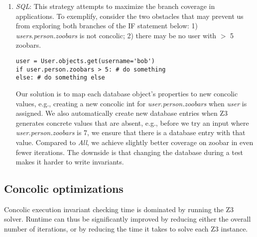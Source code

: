 \documentclass{article}
\begin{document}
\begin{enumerate}
\item \textit{SQL}:
  This strategy attempts to maximize the branch coverage in applications. To
  exemplify, consider the two obstacles that may prevent us from exploring both
  branches of the IF statement below:
  1) \textit{users.person.zoobars} is not
  concolic; 2) there may be no user with $>$ 5 zoobars.
  \begin{verbatim}user = User.objects.get(username='bob')
if user.person.zoobars > 5: # do something
else: # do something else\end{verbatim}
  Our solution is to map each database object's properties to new concolic
  values, e.g., creating a new concolic int for
  \textit{user.person.zoobars} when \textit{user} is assigned. We also
  automatically create new database entries when Z3 generates
  concrete values that are absent, e.g., before we try an input where
  \textit{user.person.zoobars} is 7, we ensure that there is a
  database entry with that value. Compared to \textit{All}, we
  achieve slightly better coverage on zoobar in even fewer iterations.
  The downside is that changing the database during a test makes it harder to
  write invariants.
\end{enumerate}

\subsection{Concolic optimizations}

Concolic execution invariant checking time is dominated by running the Z3
solver. Runtime can thus be significantly improved by reducing either the
overall number of iterations, or by reducing the time it takes to solve each Z3
instance.
\end{document}
